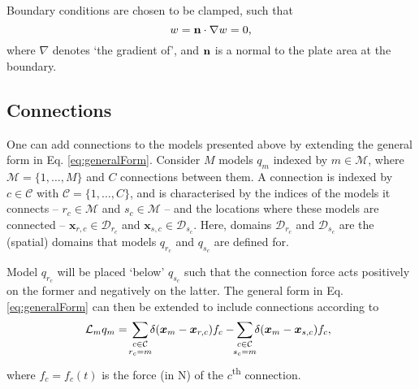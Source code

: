 \documentclass{article}
\begin{document}
Boundary conditions are chosen to be clamped, such that
\begin{equation}
        w = {\bf n} \cdot \nabla w = 0,
\end{equation}
where $\nabla$ denotes `the gradient of', and ${\bf n}$ is a normal to the plate area at the boundary.

\subsection{Connections}



One can add connections to the models presented above by extending the general form in Eq. \eqref{eq:generalForm}. Consider $M$ models $q_m$ indexed by $m \in \mathcal{M}$, where $\mathcal{M} = \{1, \hdots, M\}$ and $C$ connections between them. A connection is indexed by $c\in \mathcal{C}$ with $\mathcal{C} = \{1, \hdots, C\}$, and is characterised by the indices of the models it connects -- $r_c \in \mathcal{M}$ and $s_c\in \mathcal{M}$ -- and the locations where these models are connected -- $\boldsymbol{x}_{r, c}\in \mathcal{D}_{r_c}$ and $\boldsymbol{x}_{s, c}\in \mathcal{D}_{s_c}$. Here, domains $\mathcal{D}_{r_c}$ and $\mathcal{D}_{s_c}$ are the (spatial) domains that models $q_{r_c}$ and $q_{s_c}$ are defined for.  

Model $q_{r_c}$ will be placed `below' $q_{s_c}$ such that the connection force acts positively on the former and negatively on the latter. The general form in Eq. \eqref{eq:generalForm} can then be extended to include connections according to
\begin{equation}\label{eq:generalFormConnections}
    \!\!\!\mathcal{L}_mq_m =\!\sum_{\substack{c\in \mathcal{C}\vspace{0.1em}\\ r_c = m}}\!\! \delta(\boldsymbol{x}_m - \boldsymbol{x}_{r, c}) f_c-\!\! \sum_{\substack{c\in \mathcal{C}\vspace{0.1em}\\ s_c = m}}\!\! \delta(\boldsymbol{x}_m - \boldsymbol{x}_{s,c}) f_c,
\end{equation}
where $f_c = f_c(t)$ is the force (in N) of the $c$\textsuperscript{th} connection.
\end{document}
